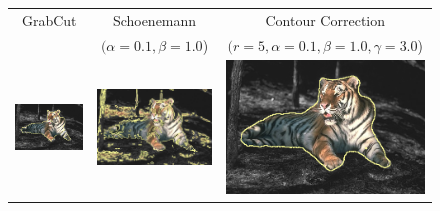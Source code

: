 \documentclass[smallextended]{svjour3}       %
\begin{document}
{{\begin{figure}[ht!]
	\center
	\begin{tabular}{ccc}
		GrabCut & Schoenemann & Contour Correction \\
		& $(\alpha=0.1, \beta=1.0$) & $(r=5, \alpha=0.1, \beta=1.0, \gamma=3.0$)\\
		\includegraphics[scale=0.2]{segmentation_bc_tiger1_gc-seg.png} &
	\includegraphics[scale=0.2]{segmentation_schoenemann_tiger1_tiger1-seg.png}&
		\includegraphics[scale=0.2]{segmentation_bc_tiger1_corrected-seg.png}\\									

\end{tabular}
\end{figure}}}
\end{document}

